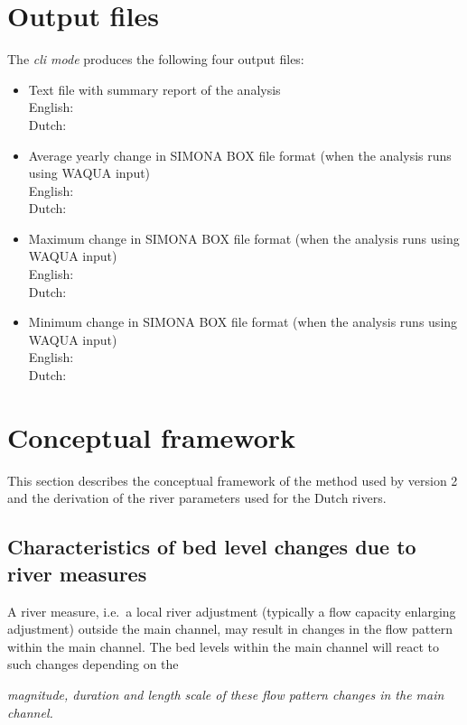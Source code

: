\section{Output files}

The \emph{cli mode} produces the following four output files:

\begin{itemize}
\item Text file with summary report of the analysis \\
English:  \\
Dutch: 
\item Average yearly change in SIMONA BOX file format (when the analysis runs using WAQUA input) \\
English:  \\
Dutch: 
\item Maximum change in SIMONA BOX file format (when the analysis runs using WAQUA input) \\
English:  \\
Dutch: 
\item Minimum change in SIMONA BOX file format (when the analysis runs using WAQUA input) \\
English:  \\
Dutch: 
\end{itemize}

\section{Conceptual framework}

This section describes the conceptual framework of the method used by \dfastmi version 2 and the derivation of the river parameters used for the Dutch rivers.

\subsection{Characteristics of bed level changes due to river measures}

A river measure, i.e.~a local river adjustment (typically a flow capacity enlarging adjustment) outside the main channel, may result in changes in the flow pattern within the main channel.
The bed levels within the main channel will react to such changes depending on the

\hspace{1cm}\emph{magnitude, duration and length scale of these flow pattern changes in the main channel.}

